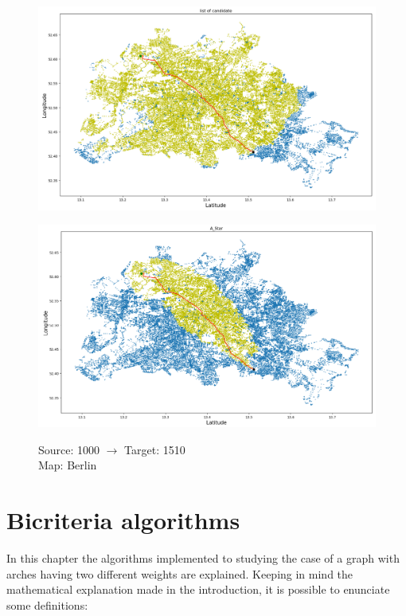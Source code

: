 \documentclass[a4paper,11pt]{report}
\begin{document}
\begin{figure}[H]
	\centering
	\begin{minipage}[b]{\textwidth}
		\includegraphics[width=\textwidth]{img/mapOutput/1000-1510BerlinLoC.png}
		\label{fig:ListOfCandidate3}
	\end{minipage}
	\hfill
	\begin{minipage}[b]{\textwidth}
		\includegraphics[width=\textwidth]{img/mapOutput/1000-1510BerlinA_Star.png}
		\label{fig:A_Start3}
	\end{minipage}
	Source: 1000 $\to$ Target: 1510\\Map: Berlin
\end{figure}

\chapter{Bicriteria algorithms}

In this chapter the algorithms implemented to studying the case of a graph with arches having two different weights are explained.
Keeping in mind the mathematical explanation made in the introduction, it is possible to enunciate some definitions:
\end{document}
